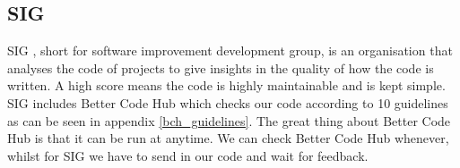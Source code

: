 \subsection{SIG}
SIG \cite{sig}, short for software improvement development group, is an organisation that analyses the code of projects to give insights in the quality of how the code is written. A high score means the code is highly maintainable and is kept simple. SIG includes Better Code Hub \cite{better_code_hub} which checks our code according to 10 guidelines as can be seen in appendix \ref{bch_guidelines}. The great thing about Better Code Hub is that it can be run at anytime. We can check Better Code Hub whenever, whilst for SIG we have to send in our code and wait for feedback.